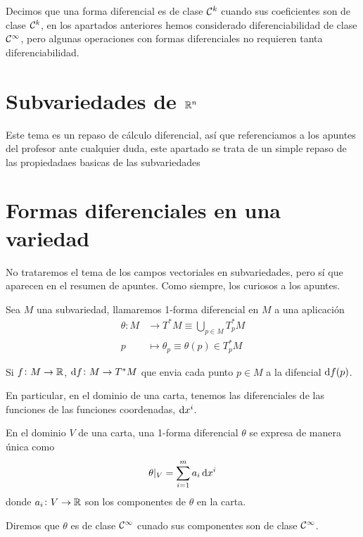 \begin{defi}
    Decimos que una forma diferencial es de clase $\mathcal{C}^k$ cuando sus coeficientes son de clase $\mathcal{C}^k$, en los apartados anteriores hemos
    considerado diferenciabilidad de clase $\mathcal{C}^\infty$, pero algunas operaciones con formas diferenciales no requieren tanta diferenciabilidad.
\end{defi}

\section{Subvariedades de $\mathbb{R}^n$}

Este tema es un repaso de cálculo diferencial, así que referenciamos a los apuntes del profesor
ante cualquier duda, este apartado se trata de un simple repaso de las propiedadaes basicas de las
subvariedades

\section{Formas diferenciales en una variedad}

\begin{obs*}
    No trataremos el tema de los campos vectoriales en subvariedades, pero sí que aparecen en el resumen de apuntes. Como siempre, los curiosos
    a los apuntes.
\end{obs*}

\setcounter{lema}{4}

\begin{defi}
    Sea $M$ una subvariedad, llamaremos 1-forma diferencial en $M$ a una aplicación
    \[
        \begin{aligned}
            \theta \colon M &\to T^\ast M \equiv \bigcup_{p \in M} T^\ast_pM \\
            p &\mapsto \theta_p \equiv \theta(p) \in T^\ast_p M
        \end{aligned}
    \]
\end{defi}

\begin{obs}
    Si $f \colon M \to \mathbb{R}$, $\dif f \colon M \to T^\ast M$ que envia cada punto $p \in M$ a la difencial $\dif f(p)$.

    En particular, en el dominio de una carta, tenemos las diferenciales de las funciones de las funciones coordenadas, $\dif x^i$.
\end{obs}

\begin{defi}
    En el dominio $V$ de una carta, una 1-forma diferencial $\theta$ se expresa de manera única como
    \[
        \theta \vert_V = \sum^m_{i=1} a_i \dif x^i
    \]
    donde $a_i \colon V \to \mathbb{R}$ son los componentes de $\theta$ en la carta.

    Diremos que $\theta$ es de clase $\mathcal{C}^\infty$ cunado sus componentes son de clase $\mathcal{C}^\infty$.
\end{defi}

